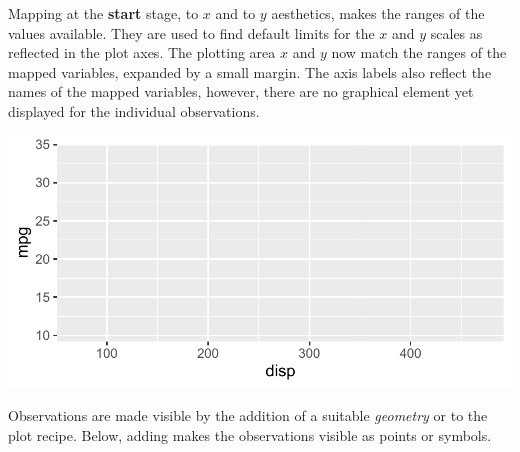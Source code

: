 \documentclass[krantz2]{krantz}\usepackage{knitr}
\begin{document}
Mapping at the \textbf{start} stage,  to $x$ and  to $y$ aesthetics, makes the ranges of the values available. They are used to find default limits for the $x$ and $y$ scales as reflected in the plot axes. The plotting area $x$ and $y$ now match the ranges of the mapped variables, expanded by a small margin. The axis labels also reflect the names of the mapped variables, however, there are no graphical element yet displayed for the individual observations.%

\begin{knitrout}\footnotesize
{}\color{fgcolor}\begin{kframe}
\begin{alltt}
\hlstd{(} 
        \hlstd{=} \hlstd{(}   
\end{alltt}
\end{kframe}

{\centering \includegraphics[width=.7\textwidth]{figure/pos-ggplot-basics-03-1} 

}


\end{knitrout}

Observations are made visible by the addition of a suitable \emph{geometry} or  to the plot recipe. Below, adding  makes the observations visible as points or symbols. %
\end{document}

